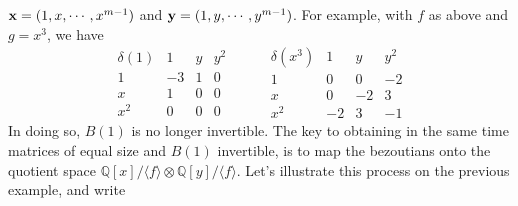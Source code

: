 \documentclass{standalone}
\begin{document}
$\bold{x} = (1, x,\cdots, x^{m-1})$ and $\bold{y} = (1, y,\cdots, y^{m-1})$. For example, with $f$ as above and $g = x^3$, we have
$$
\begin{array}{c|ccc}
\delta(1) & 1 & y & y^2\\
\hline
1 & -3 & 1 & 0\\
x & 1 & 0 & 0\\
x^2 & 0 & 0 & 0
\end{array}
\hspace{1cm}
\begin{array}{c|ccc}
\delta(x^3) & 1 & y & y^2\\
\hline
1 & 0 & 0 & -2\\
x & 0 & -2 & 3\\
x^2 & -2 & 3 & -1
\end{array}
$$
In doing so, $B(1)$ is no longer invertible. 
The key to obtaining in the same time matrices of equal size and $B(1)$ invertible, is to map the bezoutians onto the quotient space $\mathbb{Q}[x]/\langle f \rangle \otimes \mathbb{Q}[y]/\langle f \rangle$. Let's illustrate this process on the previous example, and write
\end{document}
